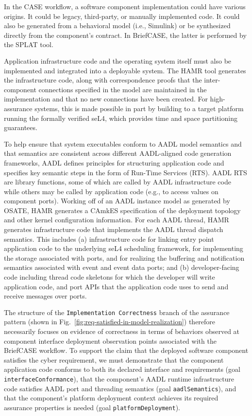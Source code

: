 In the CASE workflow, a software component implementation could have various origins.  It could be legacy, third-party, or manually implemented code. It could also be generated from a behavioral model (i.e., Simulink) or be synthesized directly from the component's contract.  In BriefCASE, the latter is performed by the SPLAT tool.

Application infrastructure code and the operating system itself must also be implemented and integrated into a deployable system.  The HAMR tool generates the infrastructure code, along with correspondence proofs that the inter-component connections specified in the model are maintained in the implementation and that no new connections have been created.  For high-assurance systems, this is made possible in part by building to a target platform running the formally verified seL4, which provides time and space partitioning guarantees.

To help ensure that system executables conform to AADL model semantics and that semantics are consistent across different AADL-aligned code generation frameworks, AADL defines principles for structuring application code and specifies key semantic steps in the form of Run-Time Services (RTS). AADL RTS are library functions, some of which are called by AADL infrastructure code while others may be called by application code (e.g., to access values on component ports). 
%
Working off of an AADL instance model as generated by OSATE, HAMR generates a CAmkES specification of the deployment topology and other kernel configuration information. For each AADL thread, HAMR generates infrastructure code that implements the AADL thread dispatch semantics. This includes 
(a) infrastructure code for linking entry point application code to the underlying seL4 scheduling framework, for implementing the storage associated with ports, and for realizing the buffering and notification semantics associated with event and event data ports; and 
(b) developer-facing code including thread code skeletons for which the developer will write application code, and port APIs that the application code uses to send and receive messages over ports.

The structure of the \texttt{Implementation Correctness} branch of the assurance pattern (shown in Fig.~\ref{fig:req-satisfied-in-model-realization}) therefore necessarily focuses on evidence of correctness in terms of behaviors observed at component interface deployment observation points associated with the BriefCASE workflow. 
%
To support the claim that the deployed software component satisfies the cyber requirement, we must demonstrate that the component application code conforms to both its declared interface and requirements (goal \texttt{interfaceConformance}), that the component's AADL runtime infrastructure code satisfies AADL port and threading semantics (goal \texttt{aadlSemantics}), and that the component's platform deployment context achieves its required assurance properties is needed (goal \texttt{platformDeployment}).

